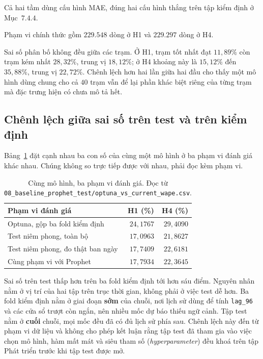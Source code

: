 \documentclass[12pt, a4paper]{report}
\begin{document}
Cả hai tầm dùng cấu hình MAE, đúng hai cấu hình thắng trên tập kiểm định ở Mục~$7.4.4$.

Phạm vi chính thức gồm $229.548$ dòng ở H1 và $229.297$ dòng ở H4.

Sai số phân bố không đều giữa các trạm. Ở H1, trạm tốt nhất đạt $11{,}89\%$ còn trạm kém nhất
$28{,}32\%$, trung vị $18{,}12\%$; ở H4 khoảng này là $15{,}12\%$ đến $35{,}88\%$, trung vị
$22{,}72\%$. Chênh lệch hơn hai lần giữa hai đầu cho thấy một mô hình dùng chung cho cả $40$
trạm vẫn để lại phần khác biệt riêng của từng trạm mà đặc trưng hiện có chưa mô tả hết.

\FloatBarrier
\subsection{Chênh lệch giữa sai số trên test và trên kiểm định}

Bảng~\ref{tab:ba_pham_vi} đặt cạnh nhau ba con số của cùng một mô hình ở ba phạm vi đánh giá
khác nhau. Chúng không so trực tiếp được với nhau, phải đọc kèm phạm vi.

\begin{table}[htbp]
\centering
\caption{Cùng mô hình, ba phạm vi đánh giá. Đọc từ
\texttt{08\_baseline\_prophet\_test/optuna\_vs\_current\_wape.csv}.}
\label{tab:ba_pham_vi}
\small
\begin{tabular}{l r r}
\toprule
\textbf{Phạm vi đánh giá} & \textbf{H1 (\%)} & \textbf{H4 (\%)} \\
\midrule
Optuna, gộp ba fold kiểm định   & $24{,}1767$ & $29{,}4090$ \\
Test niêm phong, toàn bộ        & $17{,}0963$ & $21{,}8627$ \\
Test niêm phong, đo thật ban ngày & $17{,}7409$ & $22{,}6181$ \\
Cùng phạm vi với Prophet        & $17{,}7934$ & $22{,}3645$ \\
\bottomrule
\end{tabular}
\end{table}

Sai số trên test thấp hơn trên ba fold kiểm định tới hơn sáu điểm. Nguyên nhân nằm ở vị trí của
hai tập trên trục thời gian, không phải ở việc test dễ hơn. Ba fold kiểm định nằm ở giai đoạn
\textbf{sớm} của chuỗi, nơi lịch sử dùng để tính \texttt{lag\_96} và các cửa sổ trượt còn ngắn, nên
nhiều mốc dự báo thiếu ngữ cảnh. Tập test nằm ở \textbf{cuối} chuỗi, mọi mốc đều đã có đủ lịch
sử phía sau. Chênh lệch này đến từ phạm vi dữ liệu và không cho phép kết luận rằng tập test đã
tham gia vào việc chọn mô hình, hàm mất mát và siêu tham số (\textit{hyperparameter}) đều khoá trên tập Phát triển
trước khi tập test được mở.
\end{document}
